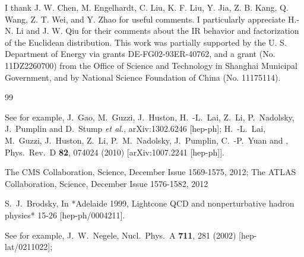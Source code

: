 
\begin{center}\itshape\end{center}
\vspace{0.5em}
I thank J. W. Chen, M. Engelhardt, C. Liu, K. F. Liu, Y. Jia, Z. B. Kang, Q. Wang, Z. T. Wei, and Y. Zhao for useful
comments. I particularly appreciate H.-N. Li and J. W. Qiu for their comments about the IR behavior and
factorization of the Euclidean distribution. This work was partially supported by the U.
S. Department of Energy via grants DE-FG02-93ER-40762, and a grant (No. 11DZ2260700) from the Office of
Science and Technology in Shanghai Municipal Government, and by National Science Foundation of China (No. 11175114).

\begin{thebibliography}{99}

See for example,
  J.~Gao, M.~Guzzi, J.~Huston, H.~-L.~Lai, Z.~Li, P.~Nadolsky, J.~Pumplin and D.~Stump {\it et al.},
  arXiv:1302.6246 [hep-ph];
  H.~-L.~Lai, M.~Guzzi, J.~Huston, Z.~Li, P.~M.~Nadolsky, J.~Pumplin, C.~-P.~Yuan and ,
  Phys.\ Rev.\ D {\bf 82}, 074024 (2010)
  [arXiv:1007.2241 [hep-ph]].

The CMS Collaboration, Science,  December Issue 1569-1575, 2012;
The ATLAS Collaboration, Science, December Issue 1576-1582, 2012

  S.~J.~Brodsky,
  In *Adelaide 1999, Lightcone QCD and nonperturbative hadron physics* 15-26
  [hep-ph/0004211].

See for example, %
  J.~W.~Negele,
  Nucl.\ Phys.\ A {\bf 711}, 281 (2002)
  [hep-lat/0211022];


\end{thebibliography}
